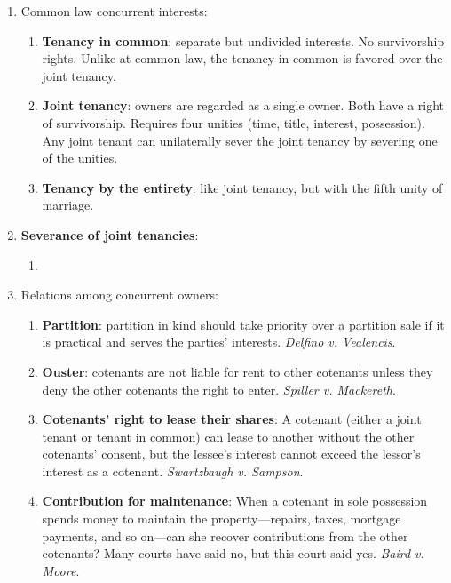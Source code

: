 \begin{enumerate}
    \item Common law concurrent interests:
    \begin{enumerate}
        \item \textbf{Tenancy in common}: separate but undivided interests. No 
        survivorship rights. Unlike at common law, the tenancy in common is 
        favored over the joint tenancy.
        \item \textbf{Joint tenancy}: owners are regarded as a single owner. 
        Both have a right of survivorship. Requires four unities (time, title, 
        interest, possession). Any joint tenant can unilaterally sever the 
        joint tenancy by severing one of the unities.
        \item \textbf{Tenancy by the entirety}: like joint tenancy, but with 
        the fifth unity of marriage.
    \end{enumerate}
    \item \textbf{Severance of joint tenancies}:
    \begin{enumerate}
        \item %
    \end{enumerate}
    \item Relations among concurrent owners:
    \begin{enumerate}
        \item \textbf{Partition}: partition in kind should take priority over 
        a partition sale if it is practical and serves the parties' interests. 
        \emph{Delfino v. Vealencis}.
        \item \textbf{Ouster}: cotenants are not liable for rent to other 
        cotenants unless they deny the other cotenants the right to enter. 
        \emph{Spiller v. Mackereth}.
        \item \textbf{Cotenants' right to lease their shares}: A cotenant 
        (either a joint tenant or tenant in common)  can lease to another 
        without the other cotenants' consent, but the lessee's interest cannot 
        exceed the lessor's interest as a cotenant. \emph{Swartzbaugh v.  
        Sampson}.
        \item \textbf{Contribution for maintenance}: When a cotenant in sole 
        possession spends money to maintain the property---repairs, taxes, 
        mortgage payments, and so on---can she recover contributions from the 
        other cotenants? Many courts have said no, but this court said yes. 
        \emph{Baird v. Moore}.

\end{enumerate}
\end{enumerate}
